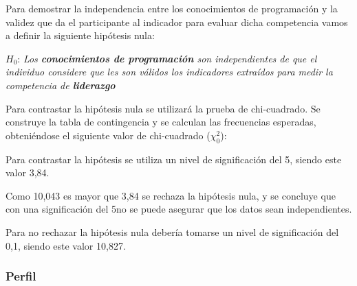 Para demostrar la independencia entre los conocimientos de programación y la validez que da el participante al indicador para evaluar dicha competencia vamos a definir la siguiente hipótesis nula:

\begin{mdframed}[style=hipotesis0]
$H_0$: \emph{Los \textbf{conocimientos de programación} son independientes de que el individuo considere que les son válidos los indicadores extraídos para medir la competencia de \textbf{liderazgo}}
\end{mdframed}

Para contrastar la hipótesis nula se utilizará la prueba de chi-cuadrado. Se construye la tabla de contingencia y se calculan las frecuencias esperadas, obteniéndose el siguiente valor de chi-cuadrado ($\chi^2_0$): 

\begin{center}
\end{center}

Para contrastar la hipótesis se utiliza un nivel de significación del 5\percentage, siendo este valor 3,84. 

\begin{center}
\end{center}

Como 10,043 es mayor que 3,84 se rechaza la hipótesis nula, y se concluye que con una significación del 5\percentage{ }no se puede asegurar que los datos sean independientes.

\begin{center}
\end{center}

Para no rechazar la hipótesis nula debería tomarse un nivel de significación del 0,1\percentage, siendo este valor 10,827.

\begin{center}
\end{center}


\subsubsection{Perfil}

